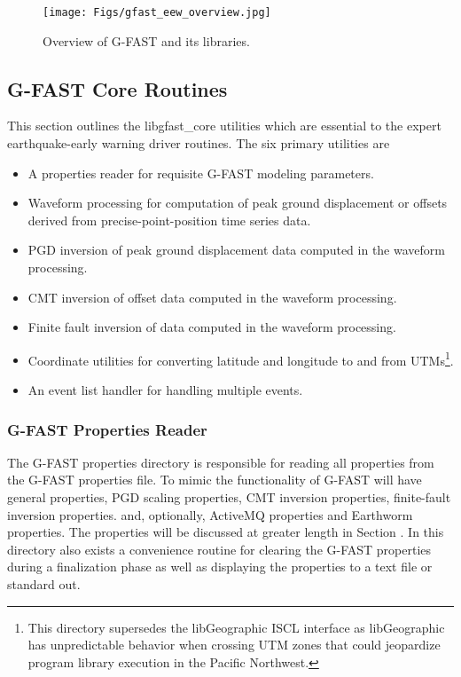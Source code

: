 \documentclass[12pt]{article}
\begin{document}
\begin{center}
\begin{figure}
\texttt{[image: Figs/gfast\_eew\_overview.jpg]}
\caption{Overview of G-FAST and its libraries.}
\end{figure}\label{F:gfastOverview}
\end{center}

\clearpage
\subsection{G-FAST Core Routines}\label{ss:gfastCore}
This section outlines the libgfast\_core utilities which are essential to the expert
earthquake-early warning driver routines.  The six primary utilities are
\begin{itemize}
  \item A properties reader for requisite G-FAST modeling parameters.
  \item Waveform processing for computation of peak ground displacement or offsets
  derived from precise-point-position time series data.
  \item PGD inversion of peak ground displacement data computed in the waveform processing.
  \item CMT inversion of offset data computed in the waveform processing.
  \item Finite fault inversion of data computed in the waveform processing.
  \item Coordinate utilities for converting latitude and longitude to and from 
  UTMs\footnote{This directory supersedes the libGeographic ISCL interface as libGeographic 
            has unpredictable behavior when crossing UTM zones that could jeopardize
            program library execution in the Pacific Northwest.}.   
  \item An event list handler for handling multiple events.
\end{itemize}

\subsubsection{G-FAST Properties Reader}
The G-FAST properties directory is responsible for reading all properties from the 
G-FAST properties file.  To mimic the functionality of G-FAST will have general
properties, PGD scaling properties, CMT inversion properties, finite-fault inversion properties.
and, optionally, ActiveMQ properties and Earthworm properties.  
The properties will be discussed at greater length in
Section \label{S:propertiesFile}.  In this directory also exists a convenience routine for
clearing the G-FAST properties during a finalization phase as well as displaying the properties
to a text file or standard out.
\end{document}
